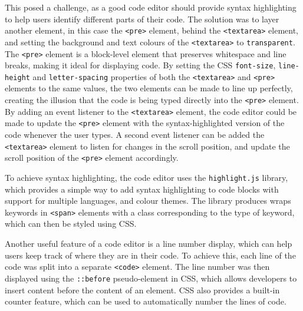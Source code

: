 \documentclass[../main.tex]{subfiles}
\begin{document}
                    This posed a challenge, as a good code editor should provide syntax
                        highlighting to help users identify different parts of their code.
                    The solution was to layer another element, in this case the \texttt{<pre>}
                        element, behind the \texttt{<textarea>} element, and setting the background and
                        text colours of the \texttt{<textarea>} to \texttt{transparent}.
                    The \texttt{<pre>} element is a block-level element that preserves whitespace
                        and line breaks, making it ideal for displaying code.
                    By setting the CSS \texttt{font-size}, \texttt{line-height} and
                        \texttt{letter-spacing} properties of both the \texttt{<textarea>} and
                        \texttt{<pre>} elements to the same values, the two elements can be made to
                        line up perfectly, creating the illusion that the code is being typed directly
                        into the \texttt{<pre>} element.
                    By adding an event listener to the \texttt{<textarea>} element, the code editor
                        could be made to update the \texttt{<pre>} element with the syntax-highlighted
                        version of the code whenever the user types.
                    A second event listener can be added the \texttt{<textarea>} element to listen
                        for changes in the scroll position, and update the scroll position of the
                        \texttt{<pre>} element accordingly.

                    To achieve syntax highlighting, the code editor uses the \texttt{highlight.js}
                        library, which provides a simple way to add syntax highlighting to code blocks
                        with support for multiple languages, and colour themes.
                    The library produces wraps keywords in \texttt{<span>} elements with a class
                        corresponding to the type of keyword, which can then be styled using CSS.

                    Another useful feature of a code editor is a line number display, which can
                        help users keep track of where they are in their code.
                    To achieve this, each line of the code was split into a separate
                        \texttt{<code>} element.
                    The line number was then displayed using the \texttt{::before} pseudo-element
                        in CSS, which allows developers to insert content before the content of an
                        element.
                    CSS also provides a built-in counter feature, which can be used to
                        automatically number the lines of code.
\end{document}
